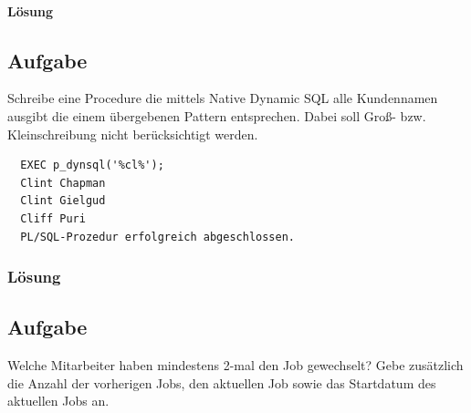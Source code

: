 \paragraph*{Lösung}
\label{subsubsec:uebung_12.aufgabe_10b.loesung}


\subsection{Aufgabe}
\label{subsec:uebung_12.aufgabe_11}
Schreibe eine Procedure die mittels Native Dynamic SQL alle Kundennamen ausgibt die einem übergebenen Pattern entsprechen. Dabei soll Groß- bzw. Kleinschreibung nicht berücksichtigt 
werden.

\begin{verbatim}
  EXEC p_dynsql('%cl%');
  Clint Chapman
  Clint Gielgud
  Cliff Puri
  PL/SQL-Prozedur erfolgreich abgeschlossen.
\end{verbatim}

\subsubsection*{Lösung}
\label{subsubsec:uebung_12.aufgabe_11.loesung}


\subsection{Aufgabe}
\label{subsec:uebung_12.aufgabe_12}
Welche Mitarbeiter haben mindestens 2-mal den Job gewechselt? Gebe zusätzlich die Anzahl der vorherigen Jobs, den aktuellen Job sowie das Startdatum des aktuellen Jobs an.

